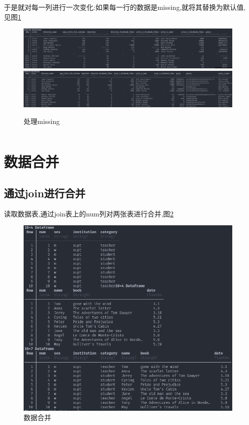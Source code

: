 \documentclass[a4paper]{article}
\begin{document}
于是就对每一列进行一次变化:如果每一行的数据是missing,就将其替换为默认值,见图\ref{fig:missing}

\begin{figure}[h]
    \label{fig:missing}
    \centering
    \includegraphics[width=12cm]{去除导演missing的行.png}
    \includegraphics[width=12cm]{处理missing.png}
    \caption{处理missing}
\end{figure}

\begin{lstlisting}[language=julia]
\end{lstlisting}

\newpage

\section{数据合并}\label{sub:data_join}
\subsection{通过join进行合并} \label{sub:data_join-lab}

读取数据表,通过join表上的num列对两张表进行合并,图\ref{fig:combine}

\begin{figure}[h]
    \centering
    \includegraphics[width=12cm]{images/合并.png}
    \caption{数据合并}
    \label{fig:combine}
\end{figure}
\end{document}

